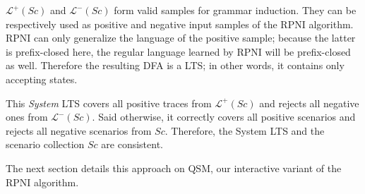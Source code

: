 $\mathcal{L}^+(Sc)$ and $\mathcal{L}^-(Sc)$ form valid samples for grammar induction. They can be respectively used as positive and negative input samples of the RPNI algorithm. RPNI can only generalize the language of the positive sample; because the latter is prefix-closed here, the regular language learned by RPNI will be prefix-closed as well. Therefore the resulting DFA is a LTS; in other words, it contains only accepting states. 

This \emph{System} LTS covers all positive traces from $\mathcal{L}^+(Sc)$ and rejects all negative ones from $\mathcal{L}^-(Sc)$. Said otherwise, it correctly covers all positive scenarios and rejects all negative scenarios from $Sc$. Therefore, the System LTS and the scenario collection $Sc$ are consistent.

The next section details this approach on QSM, our interactive variant of the RPNI algorithm. 
